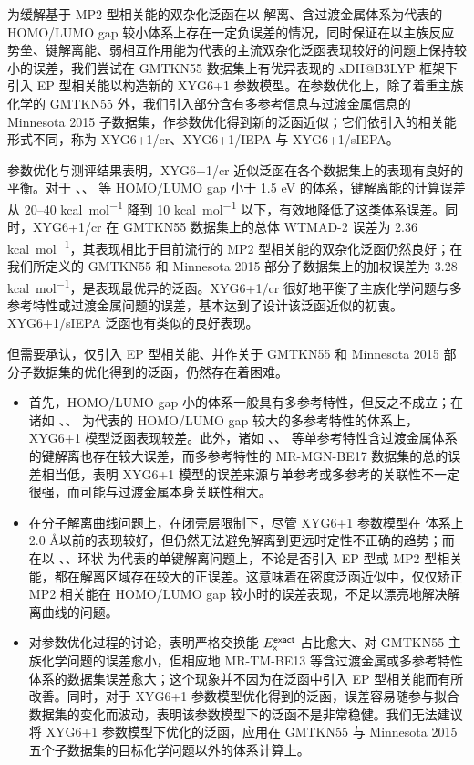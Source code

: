 为缓解基于 MP2 型相关能的双杂化泛函在以  解离、含过渡金属体系为代表的 HOMO/LUMO gap 较小体系上存在一定负误差的情况，同时保证在以主族反应势垒、键解离能、弱相互作用能为代表的主流双杂化泛函表现较好的问题上保持较小的误差，我们尝试在 GMTKN55 数据集上有优异表现的 xDH@B3LYP 框架下引入 EP 型相关能以构造新的 XYG6+1 参数模型。在参数优化上，除了着重主族化学的 GMTKN55 外，我们引入部分含有多参考信息与过渡金属信息的 Minnesota 2015 子数据集，作参数优化得到新的泛函近似；它们依引入的相关能形式不同，称为 XYG6+1/cr、XYG6+1/IEPA 与 XYG6+1/sIEPA。

参数优化与测评结果表明，XYG6+1/cr 近似泛函在各个数据集上的表现有良好的平衡。对于 、、 等 HOMO/LUMO gap 小于 1.5 eV 的体系，键解离能的计算误差从 20--40 \si{kcal.mol^{-1}} 降到 10 \si{kcal.mol^{-1}} 以下，有效地降低了这类体系误差。同时，XYG6+1/cr 在 GMTKN55 数据集上的总体 WTMAD-2 误差为 2.36 \si{kcal.mol^{-1}}，其表现相比于目前流行的 MP2 型相关能的双杂化泛函仍然良好；在我们所定义的 GMTKN55 和 Minnesota 2015 部分子数据集上的加权误差为 3.28 \si{kcal.mol^{-1}}，是表现最优异的泛函。XYG6+1/cr 很好地平衡了主族化学问题与多参考特性或过渡金属问题的误差，基本达到了设计该泛函近似的初衷。XYG6+1/sIEPA 泛函也有类似的良好表现。

但需要承认，仅引入 EP 型相关能、并作关于 GMTKN55 和 Minnesota 2015 部分子数据集的优化得到的泛函，仍然存在着困难。
\begin{itemize}[nosep]
  \item 首先，HOMO/LUMO gap 小的体系一般具有多参考特性，但反之不成立；在诸如 、、 为代表的 HOMO/LUMO gap 较大的多参考特性的体系上，XYG6+1 模型泛函表现较差。此外，诸如 、、 等单参考特性含过渡金属体系的键解离也存在较大误差，而多参考特性的 MR-MGN-BE17 数据集的总的误差相当低，表明 XYG6+1 模型的误差来源与单参考或多参考的关联性不一定很强，而可能与过渡金属本身关联性稍大。
  \item 在分子解离曲线问题上，在闭壳层限制下，尽管 XYG6+1 参数模型在  体系上 2.0 \AA 以前的表现较好，但仍然无法避免解离到更远时定性不正确的趋势；而在以 、、环状  为代表的单键解离问题上，不论是否引入 EP 型或 MP2 型相关能，都在解离区域存在较大的正误差。这意味着在密度泛函近似中，仅仅矫正 MP2 相关能在 HOMO/LUMO gap 较小时的误差表现，不足以漂亮地解决解离曲线的问题。
  \item 对参数优化过程的讨论，表明严格交换能 $E_{\textsf{x}}^{\textsf{exact}}$ 占比愈大、对 GMTKN55 主族化学问题的误差愈小，但相应地 MR-TM-BE13 等含过渡金属或多参考特性体系的数据集误差愈大；这个现象并不因为在泛函中引入 EP 型相关能而有所改善。同时，对于 XYG6+1 参数模型优化得到的泛函，误差容易随参与拟合数据集的变化而波动，表明该参数模型下的泛函不是非常稳健。我们无法建议将 XYG6+1 参数模型下优化的泛函，应用在 GMTKN55 与 Minnesota 2015 五个子数据集的目标化学问题以外的体系计算上。
\end{itemize}

